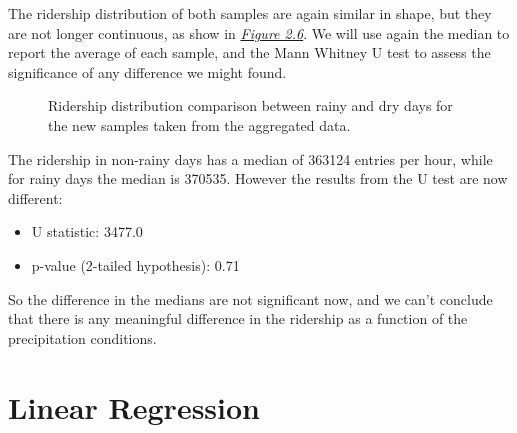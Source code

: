 \documentclass[letterpaper,10pt,english]{sphinxmanual}
\begin{document}
The ridership distribution of both samples are again similar in shape, but they are not
longer continuous, as show in {\hyperref[section1:figure26]{\emph{Figure 2.6}}}. We will use again the median
to report the average of each sample, and the Mann Whitney U test to assess the significance
of any difference we might found.
\begin{figure}[htbp]
\centering
\capstart

\caption{Ridership distribution comparison between rainy and dry days for the new samples
taken from the aggregated data.}\label{section1:figure26}\end{figure}

The ridership in non-rainy days has a median of 363124 entries per hour, while for rainy
days the median is 370535. However the results from the U test are now different:
\begin{itemize}
\item {} 
U statistic: 3477.0

\item {} 
p-value (2-tailed hypothesis): 0.71

\end{itemize}

So the difference in the medians are not significant now, and we can't conclude that
there is any meaningful difference in the ridership as a function of the precipitation
conditions.


\chapter{Linear Regression}
\label{section2:linear-regression}\label{section2::doc}
\end{document}
